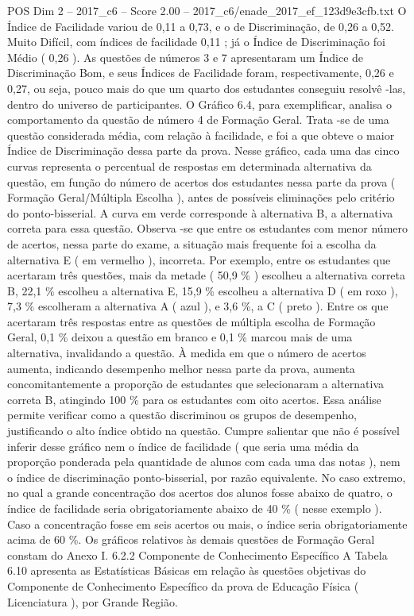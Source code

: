 \begin{textsample}{POS Dim 2 – 2017\_c6 – Score 2.00 – 2017\_c6/enade\_2017\_ef\_123d9e3cfb.txt}
O Índice de Facilidade variou de 0,11 a 0,73, e o de Discriminação, de 0,26 a 0,52.
Muito Difícil, com índices de facilidade 0,11 ; já o Índice de Discriminação foi Médio ( 0,26 ).
As questões de números 3 e 7 apresentaram um Índice de Discriminação Bom, e seus Índices de Facilidade foram, respectivamente, 0,26 e 0,27, ou seja, pouco mais do que um quarto dos estudantes conseguiu resolvê -las, dentro do universo de participantes.
O Gráfico 6.4, para exemplificar, analisa o comportamento da questão de número 4 de Formação Geral.
Trata -se de uma questão considerada média, com relação à facilidade, e foi a que obteve o maior Índice de Discriminação dessa parte da prova.
Nesse gráfico, cada uma das cinco curvas representa o percentual de respostas em determinada alternativa da questão, em função do número de acertos dos estudantes nessa parte da prova ( Formação Geral/Múltipla Escolha ), antes de possíveis eliminações pelo critério do ponto-bisserial.
A curva em verde corresponde à alternativa B, a alternativa correta para essa questão.
Observa -se que entre os estudantes com menor número de acertos, nessa parte do exame, a situação mais frequente foi a escolha da alternativa E ( em vermelho ), incorreta.
Por exemplo, entre os estudantes que acertaram três questões, mais da metade ( 50,9 \% ) escolheu a alternativa correta B, 22,1 \% escolheu a alternativa E, 15,9 \% escolheu a alternativa D ( em roxo ), 7,3 \% escolheram a alternativa A ( azul ), e 3,6 \%, a C ( preto ).
Entre os que acertaram três respostas entre as questões de múltipla escolha de Formação Geral, 0,1 \% deixou a questão em branco e 0,1 \% marcou mais de uma alternativa, invalidando a questão.
À medida em que o número de acertos aumenta, indicando desempenho melhor nessa parte da prova, aumenta concomitantemente a proporção de estudantes que selecionaram a alternativa correta B, atingindo 100 \% para os estudantes com oito acertos.
Essa análise permite verificar como a questão discriminou os grupos de desempenho, justificando o alto índice obtido na questão.
Cumpre salientar que não é possível inferir desse gráfico nem o índice de facilidade ( que seria uma média da proporção ponderada pela quantidade de alunos com cada uma das notas ), nem o índice de discriminação ponto-bisserial, por razão equivalente.
No caso extremo, no qual a grande concentração dos acertos dos alunos fosse abaixo de quatro, o índice de facilidade seria obrigatoriamente abaixo de 40 \% ( nesse exemplo ).
Caso a concentração fosse em seis acertos ou mais, o índice seria obrigatoriamente acima de 60 \%.
Os gráficos relativos às demais questões de Formação Geral constam do Anexo I. 6.2.2 Componente de Conhecimento Específico A Tabela 6.10 apresenta as Estatísticas Básicas em relação às questões objetivas do Componente de Conhecimento Específico da prova de Educação Física ( Licenciatura ), por Grande Região.

\end{textsample}
